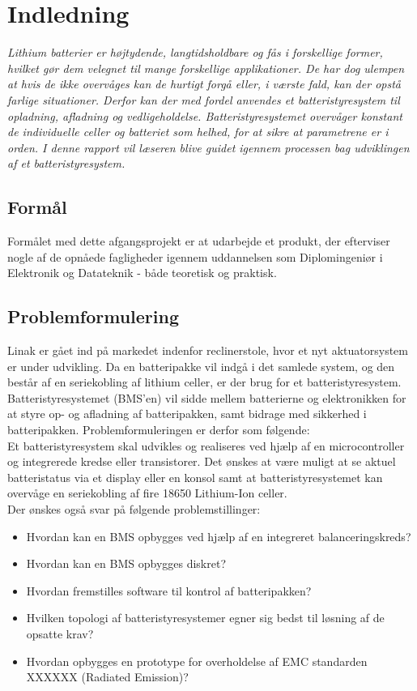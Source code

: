 \chapter{Indledning}

\emph{Lithium batterier er højtydende, langtidsholdbare og fås i forskellige former, hvilket gør dem velegnet til mange forskellige applikationer. De har dog ulempen at hvis de ikke overvåges kan de hurtigt forgå eller, i værste fald, kan der opstå farlige situationer. Derfor kan der med fordel anvendes et batteristyresystem til opladning, afladning og vedligeholdelse. Batteristyresystemet overvåger konstant de individuelle celler og batteriet som helhed, for at sikre at parametrene er i orden. I denne rapport vil læseren blive guidet igennem processen bag udviklingen af et batteristyresystem.}

\section{Formål}
Formålet med dette afgangsprojekt er at udarbejde et produkt, der efterviser nogle af de opnåede fagligheder igennem uddannelsen som Diplomingeniør i Elektronik og Datateknik - både teoretisk og praktisk.

\section{Problemformulering}
Linak er gået ind på markedet indenfor reclinerstole, hvor et nyt aktuatorsystem er under udvikling. Da en batteripakke vil indgå i det samlede system, og den består af en seriekobling af lithium celler, er der brug for et batteristyresystem. Batteristyresystemet (BMS’en) vil sidde mellem batterierne og elektronikken for at styre op- og afladning af batteripakken, samt bidrage med sikkerhed i batteripakken. Problemformuleringen er derfor som følgende:
\\

Et batteristyresystem skal udvikles og realiseres ved hjælp af en microcontroller og integrerede kredse eller transistorer. Det ønskes at være muligt at se aktuel batteristatus via et display eller en konsol samt at batteristyresystemet kan overvåge en seriekobling af fire 18650 Lithium-Ion celler.
\\

Der ønskes også svar på følgende problemstillinger: 

\begin{itemize}[noitemsep]
	\item Hvordan kan en BMS opbygges ved hjælp af en integreret balanceringskreds?
	\item Hvordan kan en BMS opbygges diskret? 
	\item Hvordan fremstilles software til kontrol af batteripakken?
	\item Hvilken topologi af batteristyresystemer egner sig bedst til løsning af de opsatte krav?
	\item Hvordan opbygges en prototype for overholdelse af EMC standarden XXXXXX (Radiated Emission)?
\end{itemize}

